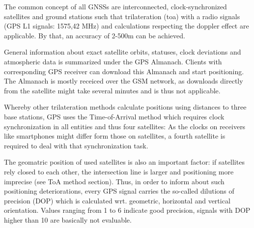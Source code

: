 

The common concept of all GNSSs are interconnected, clock-synchronized satellites and ground stations such that trilateration (\ac{toa}) with a radio signals (GPS L1 signals: 1575,42 MHz) and calculations respecting the doppler effect are applicable. By that, an accuracy of 2-500m can be achieved.

General information about exact satellite orbits, statuses, clock deviations and atmospheric data is summarized under the GPS Almanach. Clients with corresponding GPS receiver can download this Almanach and start positioning. The Almanach is mostly receiced over the GSM network, as downloads directly from the satellite might take several minutes and is thus not applicable.

Whereby other trilateration methods calculate positions using distances to three base stations, GPS uses the Time-of-Arrival method which requires clock synchronization in all entities and thus four satellites: As the clocks on receivers like smartphones might differ form those on satellites, a fourth satellite is required to deal with that synchronization task. \cite[p. 58]{hybridizationGNSSPhd}

The geomatric position of used satellites is also an important factor: if satellites rely closed to each other, the intersection line is larger and positioning more imprecise (see ToA method section). Thus, in order to inform about such positioning deteriorations, every GPS signal carries the so-called dilutions of precision (DOP) which is calculated wrt. geometric, horizontal and vertical orientation. Values ranging from 1 to 6 indicate good precision, signals with DOP higher than 10 are basically not evaluable.

